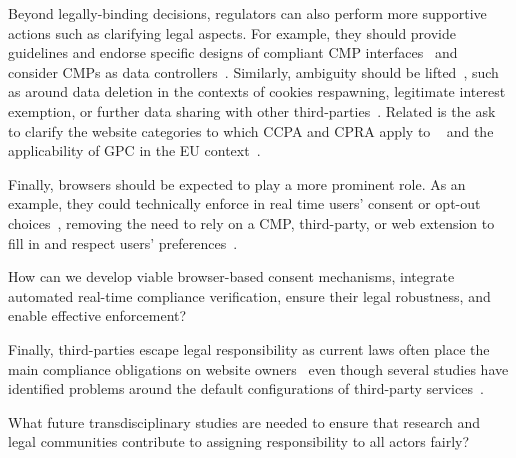 Beyond legally-binding decisions, regulators can also perform more supportive actions such as clarifying legal aspects. For example, they should provide guidelines and endorse specific designs of compliant CMP interfaces~\cite{fouadMyCookiePhoenix2022,hosseiniBilingualLongitudinalAnalysis2024,hilsMeasuringEmergenceConsent2020,matteCookieBannersRespect2020,mehrnezhadHowCanWould2022} and consider CMPs as data controllers~\cite{papadogiannakisUserTrackingPostcookie2021,tothDarkPatternsManipulation2022}. Similarly, ambiguity should be lifted~\cite{hosseiniBilingualLongitudinalAnalysis2024,azizJohnnyStillCant2024}, such as around data deletion in the contexts of cookies respawning, legitimate interest exemption, or further data sharing with other third-parties~\cite{fouadMyCookiePhoenix2022,ruppLeaveNoData2022,ruppLeaveNoData2022}. Related is the ask to clarify the website categories to which CCPA and CPRA apply to
~\cite{vannortwickSettingBarLow2022,azizJohnnyStillCant2024,charatanTwoStepsForward2024} and the applicability of GPC in the EU context~\cite{zimmeckUsabilityEnforceabilityGlobal2023,zimmeckGeneralizableActivePrivacy2024,azizJohnnyStillCant2024}.

Finally, browsers should be expected to play a more prominent role. As an example, they could technically enforce in real time users' consent or opt-out choices~\cite{papadogiannakisUserTrackingPostcookie2021,bollingerAutomatingCookieConsent2022,bouhoulaAutomatedLargeScaleAnalysis2024}, removing the need to rely on a CMP, third-party, or web extension to fill in and respect users' preferences~\cite{azizJohnnyStillCant2024,demirLargeScaleStudyCookie2024}.

\begin{opbox}
How can we develop viable browser-based consent mechanisms, integrate automated real-time compliance verification, ensure their legal robustness, and enable effective enforcement?
\end{opbox}


 Finally, third-parties escape legal responsibility as current laws often place the main compliance obligations on website owners~\cite{santosConsentManagementPlatforms2021} even though several studies have identified problems around the default configurations of third-party services~\cite{Koch-etal-25-PETs,Rodr-etal-25-PETs,tothDarkPatternsManipulation2022}.

\begin{opbox}
What future transdisciplinary studies are needed to ensure that research and legal communities contribute to assigning responsibility to all actors fairly?
\end{opbox}


